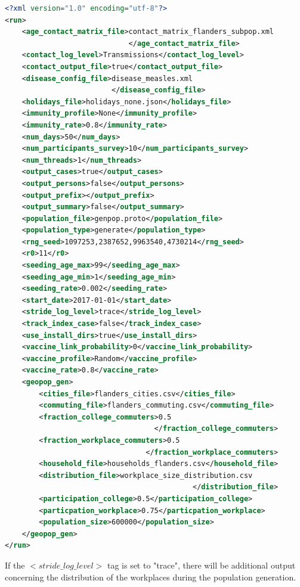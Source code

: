 \begin{center}
\begin{lstlisting}[language=XML,caption=An example of the configuration file with workplace size distribution.]
<?xml version="1.0" encoding="utf-8"?>
<run>
    <age_contact_matrix_file>contact_matrix_flanders_subpop.xml
                             </age_contact_matrix_file>
    <contact_log_level>Transmissions</contact_log_level>
    <contact_output_file>true</contact_output_file>
    <disease_config_file>disease_measles.xml
                         </disease_config_file>
    <holidays_file>holidays_none.json</holidays_file>
    <immunity_profile>None</immunity_profile>
    <immunity_rate>0.8</immunity_rate>
    <num_days>50</num_days>
    <num_participants_survey>10</num_participants_survey>
    <num_threads>1</num_threads>
    <output_cases>true</output_cases>
    <output_persons>false</output_persons>
    <output_prefix></output_prefix>
    <output_summary>false</output_summary>
    <population_file>genpop.proto</population_file>
    <population_type>generate</population_type>
    <rng_seed>1097253,2387652,9963540,4730214</rng_seed>
    <r0>11</r0>
    <seeding_age_max>99</seeding_age_max>
    <seeding_age_min>1</seeding_age_min>
    <seeding_rate>0.002</seeding_rate>
    <start_date>2017-01-01</start_date>
    <stride_log_level>trace</stride_log_level>
    <track_index_case>false</track_index_case>
    <use_install_dirs>true</use_install_dirs>
    <vaccine_link_probability>0</vaccine_link_probability>
    <vaccine_profile>Random</vaccine_profile>
    <vaccine_rate>0.8</vaccine_rate>
    <geopop_gen>
        <cities_file>flanders_cities.csv</cities_file>
        <commuting_file>flanders_commuting.csv</commuting_file>
        <fraction_college_commuters>0.5
                                   </fraction_college_commuters>
        <fraction_workplace_commuters>0.5
                                 </fraction_workplace_commuters>
        <household_file>households_flanders.csv</household_file>
        <distribution_file>workplace_size_distribution.csv
                                            </distribution_file>
        <participation_college>0.5</participation_college>
        <particpation_workplace>0.75</particpation_workplace>
        <population_size>600000</population_size>
    </geopop_gen>
</run>
\end{lstlisting}
\end{center}

If the $<stride\_log\_level>$ tag is set to "trace", there will be additional output concerning the distribution of the workplaces during the population generation.\\


